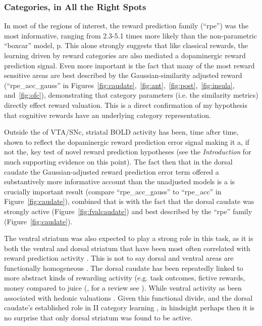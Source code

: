 \documentclass[doc,12pt]{apa}        %
\begin{document}
\subsubsection{Categories, in All the Right Spots}
\label{subsub:rightspots}
In most of the regions of interest, the reward prediction family (``rpe'') was the most informative, ranging from 2.3-5.1 times more likely than the non-parametric ``boxcar'' model, p\pageref{subsub:belowctx}.  This alone strongly suggests that like classical rewards, the learning driven by reward categories are also mediated a dopaminergic reward prediction signal.  Even more important is the fact that many of the most reward sensitive areas are best described by the Gaussian-similarity adjusted reward (``rpe\_acc\_gauss'' in Figures~\ref{fig:caudate},~\ref{fig:ant},~\ref{fig:post},~\ref{fig:insula}, and~\ref{fig:ofc}), demonstrating that category parameters (i.e. the similarity metrics) directly effect reward valuation.  This is a direct confirmation of my hypothesis that cognitive rewards have an underlying category representation.

Outside the of VTA/SNc, striatal BOLD activity has been, time after time, shown to reflect the dopaminergic reward prediction error signal making it a, if not the, key test of novel reward prediction hypotheses (see the \emph{Introduction} for much supporting evidence on this point).  The fact then that in the dorsal caudate the Gaussian-adjusted reward prediction error term offered a substantively more informative account than the unadjusted models is a is crucially important result (compare ``rpe\_acc\_gauss'' to ``rpe\_acc'' in Figure~\ref{fig:caudate}), combined that is with the fact that the dorsal caudate was strongly active (Figure~\ref{fig:fvalcaudate}) and best described by the ``rpe'' family (Figure~\ref{fig:caudate}).  
 
The ventral striatum was also expected to play a strong role in this task, as it is both the ventral and dorsal striatum that have been most often correlated with reward prediction activity \cite{ODoherty:2003p6329,Knutson:2007p1687,Schonberg:2007p518,Seger:2010p7188}.  This is not to say dorsal and ventral areas are functionally homogeneous \cite{Schonberg:2009p6669,ODoherty:2004p1269,Atallah:2007p1746}.  The dorsal caudate has been repeatedly linked to more abstract kinds of rewarding activity (e.g. task outcomes, fictive rewards, money compared to juice (, for a review see ).  While ventral activity as been associated with hedonic valuations \cite{ODoherty:2004p1269}.  Given this functional divide, and the dorsal caudate's established role in II category learning \cite{Ashby:1998p9716}, in hindsight perhaps then it is no surprise that only dorsal striatum was found to be active.
\end{document}
